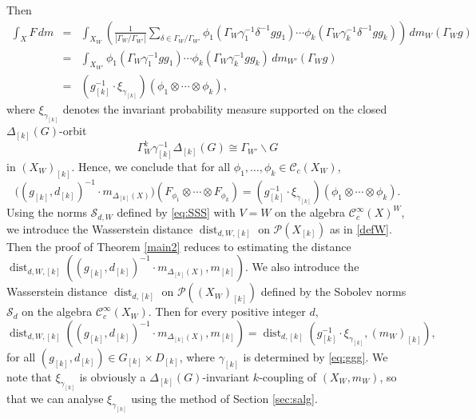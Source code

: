 \documentclass[11pt,reqno,a4paper]{amsart}
\numberwithin{equation}{section}
\newcommand{\cC}{\mathcal{C}}
\newcommand{\cS}{\mathcal{S}}
\DeclareMathOperator{\dist}{dist}
\theoremstyle{theorem}
\theoremstyle{definition}
\begin{document}
Then 
\begin{eqnarray*}
\int_X F \, dm
&=& 
\int_{X_W} \left( \frac{1}{|\Gamma_{W}/ \Gamma_{W'}|} \sum_{\delta \in \Gamma_{W}/\Gamma_{W'}} 
\phi_1(\Gamma_W \gamma_1^{-1} \delta^{-1} gg_1) \cdots \phi_k(\Gamma_W \gamma_k^{-1} \delta^{-1} gg_k)\right) \, dm_W(\Gamma_W g) \\
&=& 
\int_{X_{W'}}  
\phi_1(\Gamma_W \gamma_1^{-1} gg_1) \cdots \phi_k(\Gamma_W \gamma_k^{-1} gg_k) \, dm_{W'}(\Gamma_W g) \\
&=&
(g_{[k]}^{-1} \cdot \xi_{\gamma_{[k]}})(\phi_1 \otimes \cdots \otimes\phi_k),
\end{eqnarray*}
where $\xi_{\gamma_{[k]}}$ denotes the invariant probability measure 
supported on the  closed $\Delta_{[k]}(G)$-orbit 
\[
\Gamma_{W}^k \gamma_{[k]}^{-1} \Delta_{[k]}(G) \cong \Gamma_{W'} \backslash G
\] 
in $(X_W)_{[k]}$. Hence, we conclude that for all ${\phi}_1,\ldots,{\phi}_k \in\cC_c(X_W)$,
$$
\big((g_{[k]},d_{[k]})^{-1} \cdot m_{\Delta_{[k]}(X)}\big)(F_{{\phi}_1} \otimes \cdots \otimes F_{{\phi}_k}) 
=(g_{[k]}^{-1} \cdot \xi_{\gamma_{[k]}})(\phi_1 \otimes \cdots \otimes\phi_k).
$$
Using the norms $\cS_{d,W}$ defined by \eqref{eq:SSS} with $V=W$ on the algebra $\cC_c^\infty(X)^{W}$,
we introduce the Wasserstein distance $\dist_{d,W,{[k]}}$
on $\mathcal{P}(X_{[k]})$ as in \eqref{defW}.
Then the proof of Theorem \ref{main2} reduces to estimating the distance
$\dist_{d,W,{[k]}}((g_{[k]},d_{[k]})^{-1} \cdot m_{\Delta_{[k]}(X)},m_{[k]})$.
We also introduce the Wasserstein distance $\dist_{d,{[k]}}$
on $\mathcal{P}((X_W)_{[k]})$ defined by the Sobolev norms $\cS_d$ on 
the algebra $\cC_c^\infty(X_W)$.
Then for every positive integer $d$, 
\begin{equation}
\label{niceeq}
\dist_{d,W,{[k]}}((g_{[k]},d_{[k]})^{-1} \cdot m_{\Delta_{[k]}(X)},m_{[k]})
=
\dist_{d,[k]}(g_{[k]}^{-1} \cdot \xi_{\gamma_{[k]}},(m_W)_{[k]}),
\end{equation}
for all $(g_{[k]},d_{[k]}) \in G_{[k]} \times D_{[k]}$,
where $\gamma_{[k]}$ is determined by \eqref{eq:ggg}.
We note that $\xi_{\gamma_{[k]}}$ is obviously a $\Delta_{[k]}(G)$-invariant $k$-coupling of $(X_W,m_W)$, so that we can analyse $\xi_{\gamma_{[k]}}$ using the method of Section \ref{sec:salg}. \\
\end{document}
